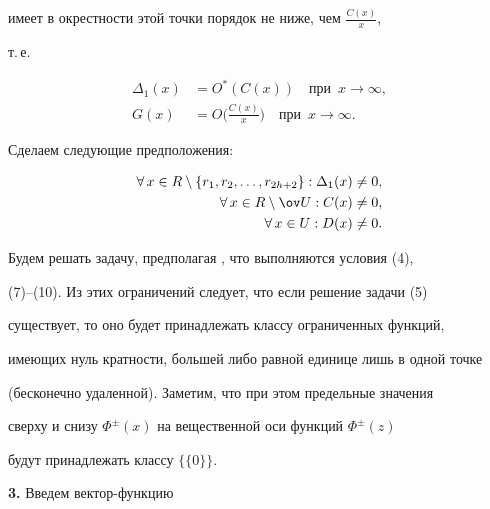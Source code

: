 имеет в окрестности этой точки порядок не ниже, чем $\frac{C(x)}{x}$, 


т.\,е. 


\begin{equation} 


\begin{split} 


\Delta_1(x)&=O^*(C(x))\quad\text{при}\ \; x\to\infty,\\ 


G(x)&=O\Big(\frac{C(x)}{x}\Big)\quad\text{при}\ \; x\to\infty. 


\end{split} 


\end{equation} 


Сделаем следующие предположения: 


\begin{equation} 


\begin{split} 


\forall\,x\in R\setminus\{r_1,r_2,\dotsc,r_{2h+2}\}: 


\Delta_1(x)\ne 0,\\ 


\forall\,x\in R\setminus\ov U:C(x)\ne 0,\\ 


\forall\,x\in U:D(x)\ne 0. 


\end{split} 


\end{equation} 


Будем решать задачу, предполагая , что выполняются условия (4), 


(7)--(10). Из этих ограничений следует, что если решение задачи (5) 


существует, то оно будет принадлежать классу ограниченных функций, 


имеющих нуль кратности, большей либо равной единице лишь в одной точке 


(бесконечно удаленной). Заметим, что при этом предельные значения 


сверху и снизу $\Phi^\pm(x)$ на вещественной оси функций $\Phi^\pm(z)$ 


будут принадлежать классу $\{\{0\}\}$. 


\medskip 


 


{\bf 3.} Введем вектор-функцию 


